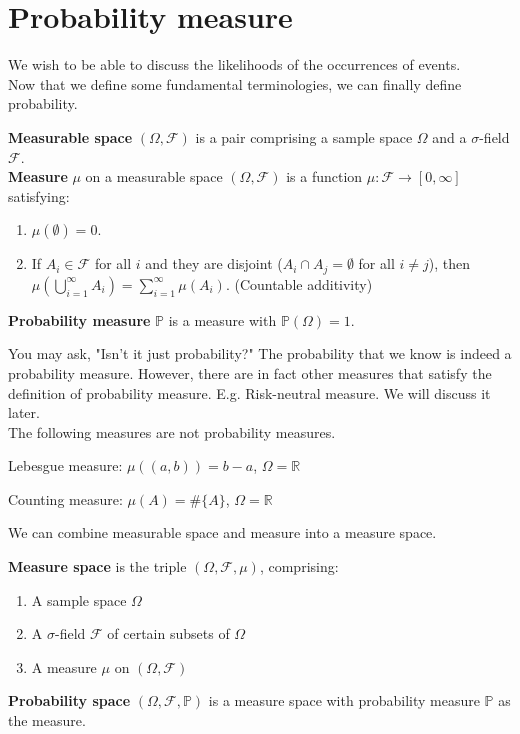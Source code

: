 \documentclass{huhtakm-template-book}
\newcommand{\prob}{\mathbb{P}}
\begin{document}
\section{Probability measure}
    We wish to be able to discuss the likelihoods of the occurrences of events.\\
    Now that we define some fundamental terminologies, we can finally define probability.
    \begin{defn} %
        \textbf{Measurable space} $(\Omega,\mathcal{F})$ is a pair comprising a sample space $\Omega$ and a $\sigma$-field $\mathcal{F}$.\\
        \textbf{Measure} $\mu$ on a measurable space $(\Omega,\mathcal{F})$ is a function $\mu:\mathcal{F}\to [0,\infty]$ satisfying:
        \begin{enumerate}
            \item $\mu(\emptyset)=0$.
            \item If $A_{i}\in\mathcal{F}$ for all $i$ and they are disjoint ($A_{i}\cap A_{j}=\emptyset$ for all $i\neq j$), then $\mu(\bigcup_{i=1}^{\infty}A_{i})=\sum_{i=1}^{\infty}\mu(A_{i})$. (Countable additivity)
        \end{enumerate}
        \textbf{Probability measure} $\prob$ is a measure with $\prob(\Omega)=1$.
    \end{defn}
    You may ask, "Isn't it just probability?" The probability that we know is indeed a probability measure. However, there are in fact other measures that satisfy the definition of probability measure. E.g. Risk-neutral measure. We will discuss it later.\\
    The following measures are not probability measures.
    \begin{eg} %
        Lebesgue measure: $\mu((a,b))=b-a$, $\Omega=\mathbb{R}$
    \end{eg}
    \begin{eg} %
        Counting measure: $\mu(A)=\#\{A\}$, $\Omega=\mathbb{R}$
    \end{eg}
    We can combine measurable space and measure into a measure space.
    \begin{defn} %
        \textbf{Measure space} is the triple $(\Omega,\mathcal{F},\mu)$, comprising:
        \begin{enumerate}
            \item A sample space $\Omega$
            \item A $\sigma$-field $\mathcal{F}$ of certain subsets of $\Omega$
            \item A measure $\mu$ on $(\Omega,\mathcal{F})$
        \end{enumerate}
        \textbf{Probability space} $(\Omega,\mathcal{F},\prob)$ is a measure space with probability measure $\prob$ as the measure.
    \end{defn}
\end{document}
